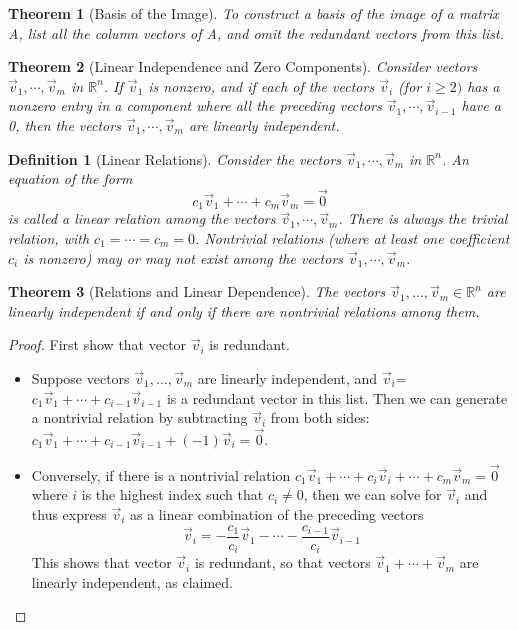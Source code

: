 \documentclass[10pt]{report}
\newtheorem{thm2}{Theorem}[section]
\newtheorem{def2}{Definition}[section]
\begin{document}
\begin{thm2}[Basis of the Image]
To construct a basis of the image of a matrix A, list all the column vectors of A, and omit the redundant vectors from this list.
\end{thm2}
\begin{thm2}[Linear Independence and Zero Components]
Consider vectors $\vec{v}_1, \cdots, \vec{v}_m$ in $\mathbb{R}^n$. If $\vec{v}_1$ is nonzero, and if each of the vectors $\vec{v}_i$ (for $i\geq 2)$ has a nonzero entry in a component where all the preceding vectors $\vec{v}_1, \cdots, \vec{v}_{i-1}$ have a 0, then the vectors $\vec{v}_1, \cdots, \vec{v}_m$ are linearly independent. 
\end{thm2}
\begin{def2}[Linear Relations]
Consider the vectors $\vec{v}_1, \cdots, \vec{v}_m$ in $\mathbb{R}^n$. An equation of the form
$$c_1\vec{v}_1+\cdots + c_m\vec{v}_m = \vec{0}$$
is called a linear relation among the vectors $\vec{v}_1, \cdots, \vec{v}_m$. There is always the trivial relation, with $c_1=\cdots =c_m=0$. Nontrivial relations (where at least one coefficient $c_i$ is nonzero) may or may not exist among the vectors $\vec{v}_1, \cdots, \vec{v}_m$.
\end{def2}
\begin{thm2}[Relations and Linear Dependence]
The vectors $\vec{v}_1, ..., \vec{v}_m\in \mathbb{R}^n$ are linearly independent if and only if there are nontrivial relations among them.
\end{thm2}
\begin{proof}
First show that vector $\vec{v}_i$ is redundant.
\begin{itemize}
\item Suppose vectors $\vec{v}_1, ..., \vec{v}_m$ are linearly independent, and $\vec{v}_i $= $c_1\vec{v}_1 + \cdots +c_{i-1} \vec{v}_{i-1}$ is a redundant vector in this list. Then we can generate a nontrivial relation by subtracting $\vec{v}_i$ from both sides: $c_1\vec{v}_1 + \cdots + c_{i-1} \vec{v}_{i-1}+(-1)\vec{v}_i = \vec{0}$.
\item Conversely, if there is a nontrivial relation $c_1\vec{v}_1 + \cdots + c_i \vec{v}_i + \cdots + c_m \vec{v}_m = \vec{0}$ where $i$ is the highest index such that $c_i\neq 0$, then we can solve for $\vec{v}_i$ and thus express $\vec{v}_i$ as a linear combination of the preceding vectors
$$\vec{v}_i=-\frac{c_1}{c_i} \vec{v}_1 - \cdots - \frac{c_{i-1}}{c_i}\vec{v}_{i-1}$$
This shows that vector $\vec{v}_i$ is redundant, so that vectors $\vec{v}_1 + \cdots + \vec{v}_m$ are linearly independent, as claimed.
\end{itemize}
\end{proof}
\end{document}
